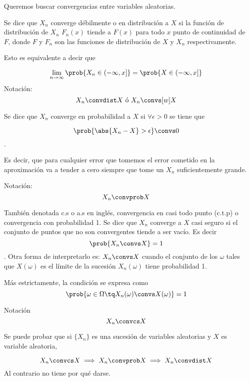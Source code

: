 \documentclass{apuntes}
\begin{document}
Queremos buscar convergencias entre variables aleatorias.

\begin{defn}

Se dice que $X_n$ converge débilmente o en distribución a $X$ si la función de distribución de $X_n$ $F_n(x)$ tiende a $F(x)$ para todo $x$ punto de continuidad de $F$, donde $F$ y $F_n$ son las funciones de distribución de $X$ y $X_n$ respectivamente.

Esto es equivalente a decir que  

\[\lim_{n\to\infty} \prob{X_n\in (-\infty, x]} = \prob{X\in (-\infty, x]} \]
Notación:
\[ X_n  \convdist X \text{ ó }  X_n \convs[w] X \] 
\end{defn}

\begin{defn} 
Se dice que $X_n$ converge en probabilidad a $X$ si $\forall \epsilon > 0$ se tiene que 

\[\prob{\abs{X_n-X} > \epsilon} \convs 0 \].

 Es decir, que para cualquier error que tomemos el error cometido en la aproximación va a tender a cero siempre que tome un $X_n$ suficientemente grande.

Notación: \[ X_n \convprob X \]
\end{defn}

\begin{defn} También denotada c.s o a.s en inglés, convergencia en casi todo punto (c.t.p) o convergencia con probabilidad 1. Se dice que $X_n$ converge a $X$ casi seguro si el conjunto de puntos que no son convergentes tiende a ser vacío. Es decir \[ \prob{X_n \convs X} = 1\]. Otra forma de interpretarlo es: $X_n \convs X$ cuando el conjunto de los $\omega$ tales que $X(\omega)$ es el límite de la sucesión $X_n(\omega)$ tiene probabilidad 1.

Más estrictamente, la condición se expresa como \[\prob{\omega \in \Omega\tq X_n(\omega) \convs X(\omega)} = 1\]

Notación \[ X_n\convcs X \]
\end{defn}


\begin{theorem}Se puede probar que si $\{X_n\}$ es una sucesión de variables aleatorias y $X$ es variable aleatoria, 

\[ X_n\convcs X \implies X_n \convprob X \implies X_n \convdist X \]
Al contrario no tiene por qué darse.
\end{theorem}
\end{document}
